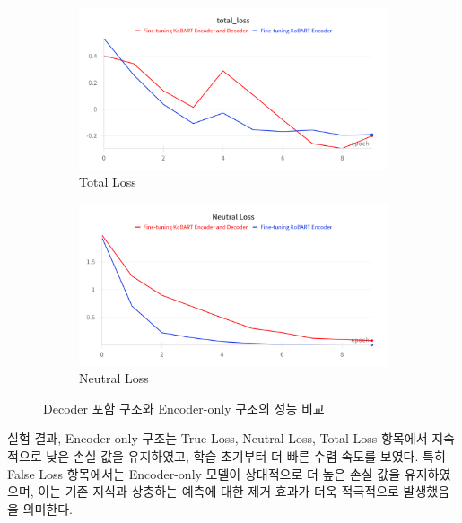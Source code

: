 \documentclass[a4paper,fleqn]{cas-sc}
\begin{document}
\begin{figure}[htbp]
    \vspace{0.4cm}  %
    \begin{subfigure}[b]{0.4\textwidth}
        \centering
        \includegraphics[width=\textwidth]{1_total_loss.png}
        \caption{Total Loss}
        \label{fig:f1}
    \end{subfigure}
    \hspace{0.02\textwidth}
    \begin{subfigure}[b]{0.4\textwidth}
        \centering
        \includegraphics[width=\textwidth]{1_neutral_loss.png}
        \caption{Neutral Loss}
        \label{fig:prec}
    \end{subfigure}
    
    \caption{Decoder 포함 구조와 Encoder-only 구조의 성능 비교}
    \label{fig:performance_grid}
    \end{figure}

    실험 결과, Encoder-only 구조는 True Loss, Neutral Loss, Total Loss 항목에서 지속적으로 낮은 손실 값을 유지하였고, 학습 초기부터 더 빠른 수렴 속도를 보였다. 특히 False Loss 항목에서는 Encoder-only 모델이 상대적으로 더 높은 손실 값을 유지하였으며, 이는 기존 지식과 상충하는 예측에 대한 제거 효과가 더욱 적극적으로 발생했음을 의미한다.
\end{document}
